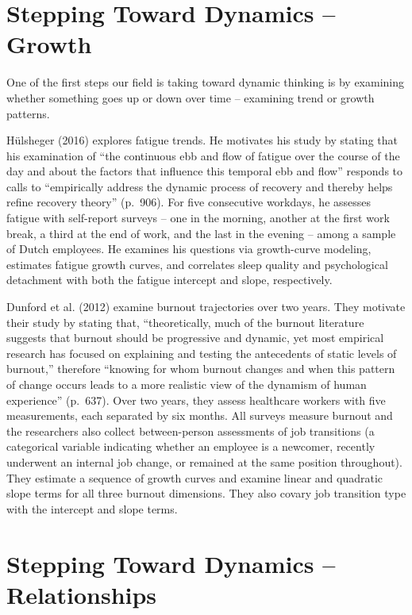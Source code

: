 \documentclass[english,,man]{apa6}
\begin{document}
\hypertarget{stepping-toward-dynamics-growth}{%
\section{Stepping Toward Dynamics -- Growth}\label{stepping-toward-dynamics-growth}}

One of the first steps our field is taking toward dynamic thinking is by examining whether something goes up or down over time -- examining trend or growth patterns.

Hülsheger (2016) explores fatigue trends. He motivates his study by stating that his examination of \enquote{the continuous ebb and flow of fatigue over the course of the day and about the factors that influence this temporal ebb and flow} responds to calls to \enquote{empirically address the dynamic process of recovery and thereby helps refine recovery theory} (p.~906). For five consecutive workdays, he assesses fatigue with self-report surveys -- one in the morning, another at the first work break, a third at the end of work, and the last in the evening -- among a sample of Dutch employees. He examines his questions via growth-curve modeling, estimates fatigue growth curves, and correlates sleep quality and psychological detachment with both the fatigue intercept and slope, respectively.

Dunford et al. (2012) examine burnout trajectories over two years. They motivate their study by stating that, \enquote{theoretically, much of the burnout literature suggests that burnout should be progressive and dynamic, yet most empirical research has focused on explaining and testing the antecedents of static levels of burnout,} therefore \enquote{knowing for whom burnout changes and when this pattern of change occurs leads to a more realistic view of the dynamism of human experience} (p.~637). Over two years, they assess healthcare workers with five measurements, each separated by six months. All surveys measure burnout and the researchers also collect between-person assessments of job transitions (a categorical variable indicating whether an employee is a newcomer, recently underwent an internal job change, or remained at the same position throughout). They estimate a sequence of growth curves and examine linear and quadratic slope terms for all three burnout dimensions. They also covary job transition type with the intercept and slope terms.

\hypertarget{stepping-toward-dynamics-relationships}{%
\section{Stepping Toward Dynamics -- Relationships}\label{stepping-toward-dynamics-relationships}}
\end{document}
